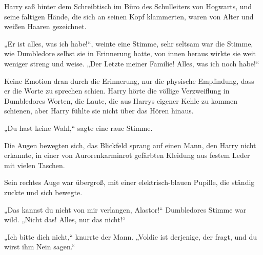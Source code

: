 \begin{em}
Harry saß hinter dem Schreibtisch im Büro des Schulleiters von Hogwarts, und seine faltigen Hände, die sich an seinen Kopf klammerten, waren von Alter und weißen Haaren gezeichnet.

„Er ist alles, was ich habe!“, weinte eine Stimme, sehr seltsam war die Stimme, wie Dumbledore selbst sie in Erinnerung hatte, von innen heraus wirkte sie weit weniger streng und weise.
„Der Letzte meiner Familie! Alles, was ich noch habe!“

Keine Emotion dran durch die Erinnerung, nur die physische Empfindung, dass er die Worte zu sprechen schien. Harry hörte die völlige Verzweiflung in Dumbledores Worten, die Laute, die aus Harrys eigener Kehle zu kommen schienen, aber Harry fühlte sie nicht über das Hören hinaus.

„Du hast keine Wahl,“ sagte eine raue Stimme.

Die Augen bewegten sich, das Blickfeld sprang auf einen Mann, den Harry nicht erkannte, in einer von Aurorenkarminrot gefärbten Kleidung aus festem Leder mit vielen Taschen.

Sein rechtes Auge war übergroß, mit einer elektrisch-blauen Pupille, die ständig zuckte und sich bewegte.

„Das kannst du nicht von mir verlangen, Alastor!“ Dumbledores Stimme war wild. „Nicht das! Alles, nur das nicht!“

„Ich bitte dich nicht,“ knurrte der Mann. „Voldie ist derjenige, der fragt, und du wirst ihm Nein sagen.“


\end{em}

